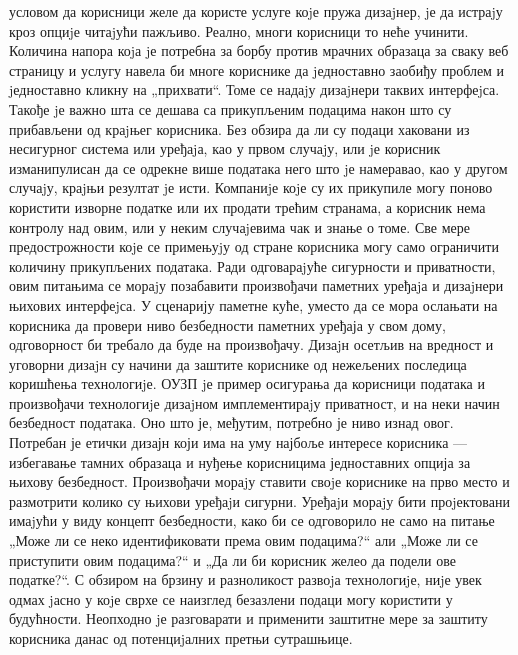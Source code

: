 \documentclass[a4paper]{article}
\begin{document}
условом да корисници желе да користе услуге коjе пружа дизаjнер, jе да истраjу кроз опциjе читаjући пажљиво. Реално, многи корисници то неће учинити. Количина напора коjа jе потребна за борбу против
мрачних образаца за сваку веб страницу и услугу навела би многе кориснике да jедноставно заобиђу проблем и jедноставно кликну на „прихвати“. Томе се надаjу дизаjнери таквих интерфеjса.
\newline  \newline
Такође jе важно шта се дешава са прикупљеним подацима након што су прибављени од краjњег корисника. Без обзира да ли су подаци хаковани из несигурног система или уређаjа, као у првом случаjу, или jе
корисник изманипулисан да се одрекне више података него што jе намеравао, као у другом случаjу, краjњи резултат jе исти. Компаниjе коjе су их прикупиле могу поново користити изворне податке или их
продати трећим странама, а корисник нема контролу над овим, или у неким случаjевима чак и знање о томе. Све мере предострожности коjе се примењуjу од стране корисника могу само ограничити количину
прикупљених података. Ради одговараjуће сигурности и приватности, овим питањима се мораjу позабавити произвођачи паметних уређаjа и дизаjнери њихових интерфеjса.
\newline  \newline
У сценарију паметне куће, уместо да се мора ослањати на корисника да провери ниво безбедности паметних уређаја у свом дому, одговорност би требало да буде на произвођачу.
Дизаjн осетљив на вредност \cite{9} и уговорни дизаjн \cite{10} су начини да заштите кориснике од нежељених последица коришћења технологиjе. ОУЗП jе пример осигурања
да корисници података и произвођачи технологиjе дизаjном имплементираjу приватност, и на неки начин безбедност података. Оно што је, међутим,
потребно је ниво изнад овог. Потребан је етички дизајн који има на уму најбоље интересе корисника — избегавање тамних образаца и нуђење корисницима једноставних опција за
њихову безбедност.
\newline  \newline
Произвођачи мораjу ставити своjе кориснике на прво место и размотрити колико су њихови уређаjи сигурни. Уређаjи мораjу бити проjектовани имаjући у виду концепт
безбедности, како би се одговорило не само на питање „Може ли се неко идентификовати према овим подацима?“ али „Може ли се приступити овим подацима?“ и „Да ли
би корисник желео да подели ове податке?“. С обзиром на брзину и разноликост развоjа технологиjе, ниjе увек одмах jасно у коjе сврхе се наизглед безазлени
подаци могу користити у будућности. Неопходно jе разговарати и применити заштитне мере за заштиту корисника данас од потенциjалних претњи сутрашњице.
\end{document}
